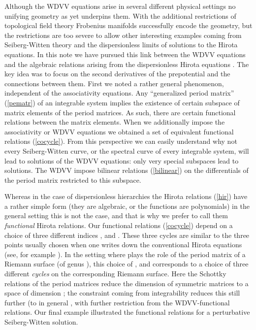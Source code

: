 \documentclass[a4paper,]{article}
\def\Bf#1{\mbox{\boldmath \myHighlight{$#1$}\coordHE{}}}
\begin{document}
Although the WDVV equations arise in several different physical settings
no unifying geometry as yet underpins them. With the additional restrictions
of topological field theory Frobenius manifolds successfully encode
the geometry, but the restrictions are too severe to allow other interesting
examples coming from Seiberg-Witten theory and the dispersionless limits of
solutions to the Hirota equations.
In this note we have pursued this link between the WDVV equations and 
the algebraic relations arising from the dispersionless Hirota 
equations \cite{BMRWZ}. The key idea was to focus on the second derivatives
of the prepotential and the connections between them.
First we noted a rather general phenomenon, independent of the 
associativity equations. Any ``generalized period matrix'' (\ref{pematr})
of an integrable system implies the existence of certain subspace
of matrix elements of the period matrices.
As such, there are certain functional relations between the matrix elements.
When we additionally impose the associativity or WDVV equations
we obtained a set of equivalent functional relations (\ref{cocycle}).
From this perspective we can easily understand why not every Seiberg-Witten
curve, or the spectral curve of every integrable system, will lead to
solutions of the WDVV equations: only very special subspaces lead to
solutions. The WDVV impose bilinear relations (\ref{bilinear}) 
on the differentials of the period matrix restricted to this subspace.

Whereas in the case of dispersionless hierarchies the Hirota relations
(\ref{hir}) have a rather simple form (they are algebraic, or the 
functions \myHighlight{$T_{ij}(\Bf\varphi)$}\coordHE{} are polynomials) in the general setting
this is not the case,
and that is why we prefer to call them {\em functional} Hirota relations.
Our functional relations (\ref{cocycle}) depend on a choice of
three different indices \coordHE{}, \coordHE{} and \coordHE{}.
These three cycles are similar to the three points usually chosen when
one writes down the conventional Hirota equations 
(see, for example \cite{ZaHi}).
In the setting where \coordHE{} plays the role of the period matrix of
a Riemann surface (of genus \coordHE{}), this choice of \coordHE{}, \coordHE{} and \coordHE{}
corresponds to a choice of three different {\em cycles} on the corresponding 
Riemann surface. Here the Schottky relations of the period matrices 
reduce the dimension of \coordHE{} symmetric matrices to a space of
dimension \coordHE{}; the constraint coming from integrability reduces this
still further (to in general \coordHE{}, with further restriction from the
WDVV-functional relations.
Our final example illustrated the functional relations for a 
perturbative Seiberg-Witten solution.
\end{document}
